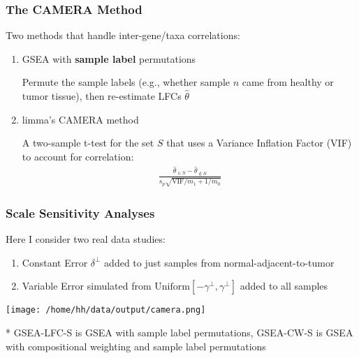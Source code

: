 \documentclass[11pt,t]{beamer}
\begin{document}
\begin{frame}
  \frametitle{The CAMERA Method}
  

  Two methods that handle inter-gene/taxa correlations:
  \begin{enumerate}
  \item GSEA with \textbf{sample label} permutations
   \vspace{10px}
    
   Permute the sample labels (e.g., whether sample \(n\) came from healthy or tumor tissue), then re-estimate LFCs \(\hat{\theta}\)

   \pause
    
  \item limma's CAMERA method

    \vspace{10px}
    A two-sample t-test for the set \(S\) that uses a Variance Inflation Factor (VIF) to account for correlation:
    \begin{align*}
      \frac{\hat{\theta}_{\in S} - \hat{\theta}_{\notin S}}{s_p\sqrt{\text{VIF}/m_1+1/m_0}}
    \end{align*} 

  \end{enumerate}
\end{frame}

\begin{frame}
  \frametitle{Scale Sensitivity Analyses}
  \footnotesize{Here I consider two real data studies:}
  \begin{enumerate}
    \item \footnotesize{Constant Error \(\delta^\perp\) added to just samples from normal-adjacent-to-tumor}
    \item \footnotesize{Variable Error simulated from \(\text{Uniform}[-\gamma^\perp,\gamma^\perp]\) added to all samples}
  \end{enumerate}
   \begin{center}
    \texttt{[image: /home/hh/data/output/camera.png]}
   \end{center}

   \footnotesize{* GSEA-LFC-S is GSEA with sample label permutations, GSEA-CW-S is GSEA with compositional weighting and sample label permutations}
\end{frame}
\end{document}
